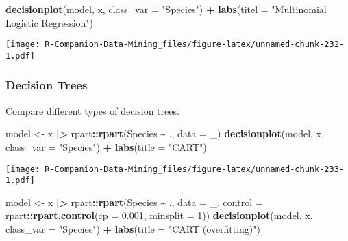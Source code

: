\documentclass[
  notitlepage]{book}
\newenvironment{Shaded}{\begin{snugshade}}{\end{snugshade}}
\newcommand{\DataTypeTok}[1]{\textcolor[rgb]{0.13,0.29,0.53}{#1}}
\newcommand{\DecValTok}[1]{\textcolor[rgb]{0.00,0.00,0.81}{#1}}
\newcommand{\ErrorTok}[1]{\textcolor[rgb]{0.64,0.00,0.00}{\textbf{#1}}}
\newcommand{\FloatTok}[1]{\textcolor[rgb]{0.00,0.00,0.81}{#1}}
\newcommand{\KeywordTok}[1]{\textcolor[rgb]{0.13,0.29,0.53}{\textbf{#1}}}
\newcommand{\NormalTok}[1]{#1}
\newcommand{\OperatorTok}[1]{\textcolor[rgb]{0.81,0.36,0.00}{\textbf{#1}}}
\newcommand{\StringTok}[1]{\textcolor[rgb]{0.31,0.60,0.02}{#1}}
\begin{document}
\begin{Shaded}
\begin{Highlighting}[]
\KeywordTok{decisionplot}\NormalTok{(model, x, }\DataTypeTok{class\_var =} \StringTok{"Species"}\NormalTok{) }\OperatorTok{+}\StringTok{ }
\StringTok{  }\KeywordTok{labs}\NormalTok{(}\DataTypeTok{titel =} \StringTok{"Multinomial Logistic Regression"}\NormalTok{)}
\end{Highlighting}
\end{Shaded}

\texttt{[image: R-Companion-Data-Mining\_files/figure-latex/unnamed-chunk-232-1.pdf]}

\hypertarget{decision-trees}{%
\subsubsection{Decision Trees}\label{decision-trees}}

Compare different types of decision trees.

\begin{Shaded}
\begin{Highlighting}[]
\NormalTok{model \textless{}{-}}\StringTok{ }\NormalTok{x }\OperatorTok{|}\ErrorTok{\textgreater{}}\StringTok{ }\NormalTok{rpart}\OperatorTok{::}\KeywordTok{rpart}\NormalTok{(Species }\OperatorTok{\textasciitilde{}}\StringTok{ }\NormalTok{., }\DataTypeTok{data =}\NormalTok{ \_)}
\KeywordTok{decisionplot}\NormalTok{(model, x, }\DataTypeTok{class\_var =} \StringTok{"Species"}\NormalTok{) }\OperatorTok{+}\StringTok{ }
\StringTok{  }\KeywordTok{labs}\NormalTok{(}\DataTypeTok{title =} \StringTok{"CART"}\NormalTok{)}
\end{Highlighting}
\end{Shaded}

\texttt{[image: R-Companion-Data-Mining\_files/figure-latex/unnamed-chunk-233-1.pdf]}

\begin{Shaded}
\begin{Highlighting}[]
\NormalTok{model \textless{}{-}}\StringTok{ }\NormalTok{x }\OperatorTok{|}\ErrorTok{\textgreater{}}\StringTok{ }\NormalTok{rpart}\OperatorTok{::}\KeywordTok{rpart}\NormalTok{(Species }\OperatorTok{\textasciitilde{}}\StringTok{ }\NormalTok{., }\DataTypeTok{data =}\NormalTok{ \_,}
  \DataTypeTok{control =}\NormalTok{ rpart}\OperatorTok{::}\KeywordTok{rpart.control}\NormalTok{(}\DataTypeTok{cp =} \FloatTok{0.001}\NormalTok{, }\DataTypeTok{minsplit =} \DecValTok{1}\NormalTok{))}
\KeywordTok{decisionplot}\NormalTok{(model, x, }\DataTypeTok{class\_var =} \StringTok{"Species"}\NormalTok{) }\OperatorTok{+}\StringTok{ }
\StringTok{  }\KeywordTok{labs}\NormalTok{(}\DataTypeTok{title =} \StringTok{"CART (overfitting)"}\NormalTok{)}
\end{Highlighting}
\end{Shaded}
\end{document}
